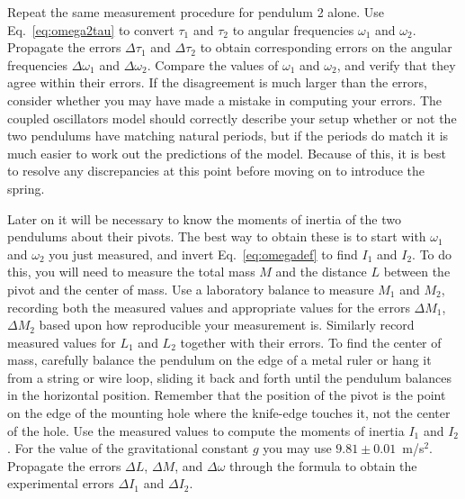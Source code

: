 \documentclass{revtex4}
\begin{document}
Repeat the same measurement procedure for pendulum 2 alone.  Use
Eq.~\ref{eq:omega2tau} to convert $\tau_1$ and $\tau_2$ to angular
frequencies $\omega_1$ and $\omega_2$.  Propagate the errors
$\Delta\tau_1$ and $\Delta\tau_2$ to obtain corresponding errors on
the angular frequencies $\Delta\omega_1$ and $\Delta\omega_2$.
Compare the values of $\omega_1$ and $\omega_2$, and verify that they
agree within their errors.  If the disagreement is much larger than the
errors, consider whether you may have made a mistake in computing your
errors.  The coupled oscillators model should correctly describe your
setup whether or not the two pendulums have matching natural periods,
but if the periods do match it is much easier to work out the 
predictions of the model.  Because of this, it is best to resolve
any discrepancies at this point before moving on to introduce the
spring.

Later on it will be necessary to know the moments of inertia of the
two pendulums about their pivots.  The best way to obtain these is to
start with $\omega_1$ and $\omega_2$ you just measured, and invert
Eq.~\ref{eq:omegadef} to find $I_1$ and $I_2$.  To do this, you will
need to measure the total mass $M$ and the distance $L$ between the
pivot and the center of mass.  Use a laboratory balance to measure
$M_1$ and $M_2$, recording both the measured values and appropriate
values for the errors $\Delta M_1$, $\Delta M_2$ based upon how
reproducible your measurement is.  Similarly record measured values
for $L_1$ and $L_2$ together with their errors.  To find the center
of mass, carefully balance the pendulum on the edge of a metal ruler
or hang it from a string or wire loop, sliding it back and forth until
the pendulum balances in the horizontal position.  Remember that the
position of the pivot is the point on the edge of the mounting hole where
the knife-edge touches it, not the center of the hole.  Use the measured
values to compute the moments of inertia $I_1$ and $I_2$.  For the
value of the gravitational constant $g$ you may use $9.81\pm 0.01$~m/s$^2$.
Propagate the errors $\Delta L$, $\Delta M$, and $\Delta\omega$ through the
formula to obtain the experimental errors $\Delta I_1$ and $\Delta I_2$.
\end{document}
